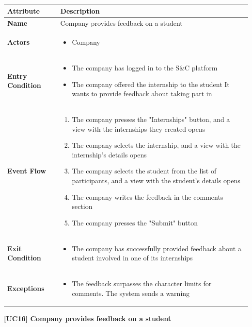 \begin{center}
    
    \begin{tabular}{|p{3cm}|p{9cm}|}
    \hline
    \textbf{Attribute} & \textbf{Description} \\ \hline
    \textbf{Name} & Company provides feedback on a student \\ \hline
    \textbf{Actors} & 
    \begin{itemize}
        \item Company
    \end{itemize} \\ \hline
    \textbf{Entry Condition} & 
    \begin{itemize}
        \item The company has logged in to the S\&C platform
        \item The company offered the internship to the student It wants to provide feedback about taking part in
    \end{itemize}\\ \hline
    \textbf{Event Flow} & 
    \begin{enumerate}
        \item The company presses the "Internships" button, and a view with the internships they created opens
        \item The company selects the internship, and a view with the internship's details opens
        \item The company selects the student from the list of participants, and a view with the student's details opens
        \item The company writes the feedback in the comments section
        \item The company presses the "Submit" button
    \end{enumerate} \\ \hline
    \textbf{Exit Condition} & 
    \begin{itemize}
        \item The company has successfully provided feedback about a student involved in one of its internships
    \end{itemize}\\ \hline
    \textbf{Exceptions} & 
    \begin{itemize}
        \item The feedback surpasses the character limits for comments. The system sends a warning
    \end{itemize}
    \\ \hline
    \end{tabular}
    \newline
    \newline
    \textbf{[UC16] Company provides feedback on a student}
    \newline
    \newline


\end{center}

